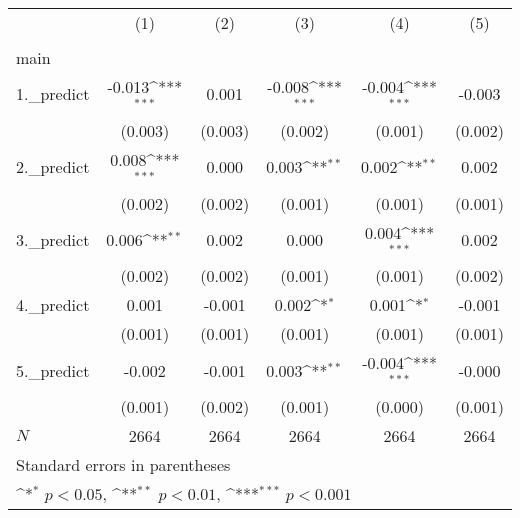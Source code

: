 {
\def\sym#1{\ifmmode^{#1}\else\(^{#1}\)\fi}
\begin{tabular}{l*{5}{c}}
\hline\hline
            &\multicolumn{1}{c}{(1)}&\multicolumn{1}{c}{(2)}&\multicolumn{1}{c}{(3)}&\multicolumn{1}{c}{(4)}&\multicolumn{1}{c}{(5)}\\
            &\multicolumn{1}{c}{} &\multicolumn{1}{c}{} &\multicolumn{1}{c}{} &\multicolumn{1}{c}{} &\multicolumn{1}{c}{} \\
\hline
main        &                     &                     &                     &                     &                     \\
1.\_predict  &      -0.013\sym{***}&       0.001         &      -0.008\sym{***}&      -0.004\sym{***}&      -0.003         \\
            &     (0.003)         &     (0.003)         &     (0.002)         &     (0.001)         &     (0.002)         \\
[1em]
2.\_predict  &       0.008\sym{***}&       0.000         &       0.003\sym{**} &       0.002\sym{**} &       0.002         \\
            &     (0.002)         &     (0.002)         &     (0.001)         &     (0.001)         &     (0.001)         \\
[1em]
3.\_predict  &       0.006\sym{**} &       0.002         &       0.000         &       0.004\sym{***}&       0.002         \\
            &     (0.002)         &     (0.002)         &     (0.001)         &     (0.001)         &     (0.002)         \\
[1em]
4.\_predict  &       0.001         &      -0.001         &       0.002\sym{*}  &       0.001\sym{*}  &      -0.001         \\
            &     (0.001)         &     (0.001)         &     (0.001)         &     (0.001)         &     (0.001)         \\
[1em]
5.\_predict  &      -0.002         &      -0.001         &       0.003\sym{**} &      -0.004\sym{***}&      -0.000         \\
            &     (0.001)         &     (0.002)         &     (0.001)         &     (0.000)         &     (0.001)         \\
\hline
\(N\)       &        2664         &        2664         &        2664         &        2664         &        2664         \\
\hline\hline
\multicolumn{6}{l}{\footnotesize Standard errors in parentheses}\\
\multicolumn{6}{l}{\footnotesize \sym{*} \(p<0.05\), \sym{**} \(p<0.01\), \sym{***} \(p<0.001\)}\\
\end{tabular}
}

